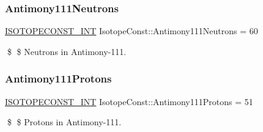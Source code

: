 \subsubsection{\texorpdfstring{Antimony111\+Neutrons}{Antimony111Neutrons}}
{\footnotesize\ttfamily \mbox{\hyperlink{group___isotope_const-_macros_ga5f18360b3e99483a35c32d789e62621c}{I\+S\+O\+T\+O\+P\+E\+C\+O\+N\+S\+T\+\_\+\+I\+NT}} Isotope\+Const\+::\+Antimony111\+Neutrons = 60}

\$ \$ Neutrons in Antimony-\/111. \mbox{\label{group___isotope_const-_antimony-_sb111_ga5da1771d61ac60ffc70e851743c79c0a}} 
\subsubsection{\texorpdfstring{Antimony111\+Protons}{Antimony111Protons}}
{\footnotesize\ttfamily \mbox{\hyperlink{group___isotope_const-_macros_ga5f18360b3e99483a35c32d789e62621c}{I\+S\+O\+T\+O\+P\+E\+C\+O\+N\+S\+T\+\_\+\+I\+NT}} Isotope\+Const\+::\+Antimony111\+Protons = 51}

\$ \$ Protons in Antimony-\/111. 